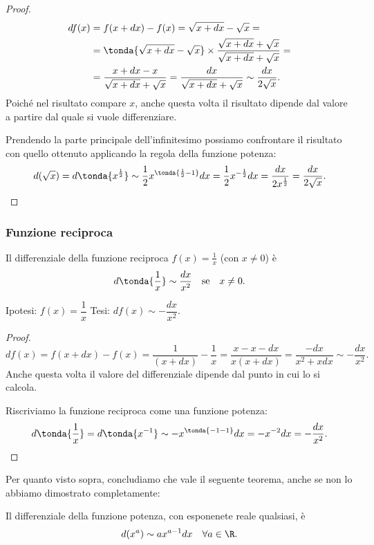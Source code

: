 \begin{proof}
\begin{align*}
 df(x) &= f(x+dx)-f(x)=\sqrt{x+dx}-\sqrt{x}=\\
 &=\tonda{\sqrt{x+dx}-\sqrt{x}}\times\frac{\sqrt{x+dx}+
 \sqrt{x}}{\sqrt{x+dx}+\sqrt{x}}=\\
 &=\frac{x+dx-x}{\sqrt{x+dx}+\sqrt{x}}
 =\frac{dx}{\sqrt{x+dx}+\sqrt{x}}\sim\frac{dx}{2\sqrt{x}}.
\end{align*}
 Poiché nel risultato compare $x$, anche questa volta il risultato
 dipende dal valore a partire dal quale si vuole differenziare. 

Prendendo la parte principale dell'infinitesimo possiamo confrontare il 
risultato con quello ottenuto applicando la regola della funzione potenza:
\[d(\sqrt{x}) = d\tonda{x^{\frac{1}{2}}}
  \sim\frac{1}{2}x^{\tonda{\frac{1}{2}-1}}dx 
  =\frac{1}{2}x^{-\frac{1}{2}}dx
  =\frac{dx}{2x^{\frac{1}{2}}}
  =\frac{dx}{2\sqrt{x}}.\]

\end{proof}

\subsubsection{Funzione reciproca}
\label{subsubsec:diff01_diffrecip}
\begin{teorema}
 Il differenziale della funzione reciproca $f(x)=\frac{1}{x}$ (con $x \ne 0$)
 è  \[d\tonda{\frac{1}{x}}\sim\frac{dx}{x^2} \quad \text{se} \quad x \ne 0.\]
\end{teorema}

\noindent Ipotesi: $f(x)=\dfrac{1}{x}$\tab 
Tesi: $df(x)\sim-\dfrac{dx}{x^2}.$

\begin{proof}
\[
 df(x)= f(x+dx)-f(x)=\frac{1}{(x+dx)}-\frac{1}{x}=
 \frac{x-x-dx}{x(x+dx)}=\frac{-dx}{x^2+xdx}\sim-\frac{dx}{x^2}.
\]
Anche questa volta il valore del differenziale dipende dal punto in cui
lo si calcola. 

Riscriviamo la funzione reciproca come una funzione potenza:
\[d\tonda{\frac{1}{x}} = d\tonda{x^{-1}}
  \sim -x^{\tonda{-1-1}}dx 
  =-x^{-2}dx
  =-\frac{dx}{x^{2}}.\]

\end{proof}

Per quanto visto sopra, concludiamo che vale il seguente teorema, anche se non
lo abbiamo dimostrato completamente:

\begin{teorema}
 Il differenziale della funzione potenza, con esponenete reale qualsiasi, è 
 \[d(x^a) \sim ax^{a-1}dx \quad \forall a \in \R.\]
\end{teorema}

